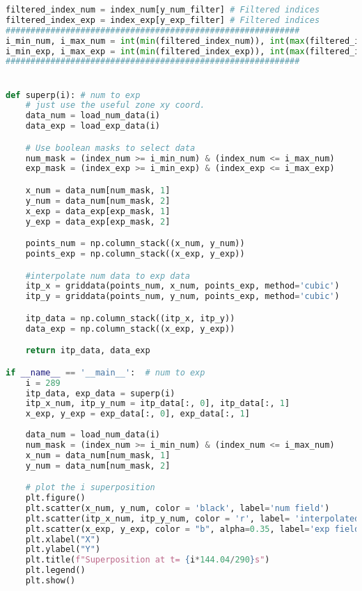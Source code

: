 \documentclass[12pt,a4paper]{article}
\begin{document}
\begin{lstlisting}[language=Python, caption={Superposition en zone utile}]
filtered_index_num = index_num[y_num_filter] # Filtered indices
filtered_index_exp = index_exp[y_exp_filter] # Filtered indices
###########################################################
i_min_num, i_max_num = int(min(filtered_index_num)), int(max(filtered_index_num))     #  minimum index and maximum index for useful numeric zone
i_min_exp, i_max_exp = int(min(filtered_index_exp)), int(max(filtered_index_exp))     #  minimum index and maximum index for useful experimental zone
###########################################################


def superp(i): # num to exp
    # just use the useful zone xy coord. 
    data_num = load_num_data(i)
    data_exp = load_exp_data(i)

    # Use boolean masks to select data
    num_mask = (index_num >= i_min_num) & (index_num <= i_max_num)
    exp_mask = (index_exp >= i_min_exp) & (index_exp <= i_max_exp)

    x_num = data_num[num_mask, 1]
    y_num = data_num[num_mask, 2]
    x_exp = data_exp[exp_mask, 1]
    y_exp = data_exp[exp_mask, 2]

    points_num = np.column_stack((x_num, y_num))  
    points_exp = np.column_stack((x_exp, y_exp)) 

    #interpolate num data to exp data
    itp_x = griddata(points_num, x_num, points_exp, method='cubic')
    itp_y = griddata(points_num, y_num, points_exp, method='cubic')

    itp_data = np.column_stack((itp_x, itp_y))
    data_exp = np.column_stack((x_exp, y_exp))

    return itp_data, data_exp

if __name__ == '__main__':  # num to exp
    i = 289
    itp_data, exp_data = superp(i)
    itp_x_num, itp_y_num = itp_data[:, 0], itp_data[:, 1]
    x_exp, y_exp = exp_data[:, 0], exp_data[:, 1]
    
    data_num = load_num_data(i)
    num_mask = (index_num >= i_min_num) & (index_num <= i_max_num)
    x_num = data_num[num_mask, 1]
    y_num = data_num[num_mask, 2]

    # plot the i superposition
    plt.figure()
    plt.scatter(x_num, y_num, color = 'black', label='num field')
    plt.scatter(itp_x_num, itp_y_num, color = 'r', label= 'interpolated num field')
    plt.scatter(x_exp, y_exp, color = "b", alpha=0.35, label='exp field')
    plt.xlabel("X")
    plt.ylabel("Y")
    plt.title(f"Superposition at t= {i*144.04/290}s")
    plt.legend()
    plt.show()


\end{lstlisting}
\end{document}
